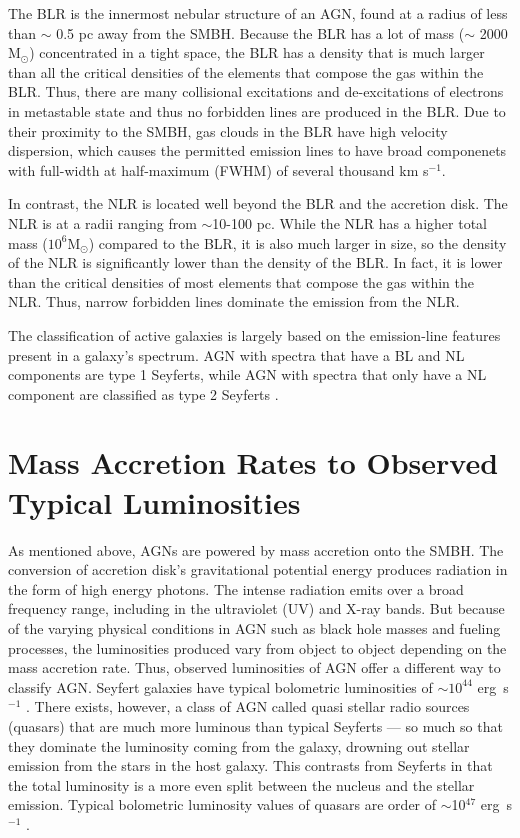The BLR is the innermost nebular structure of an AGN, found at a radius of less than $\sim$ 0.5 pc away from the SMBH.
Because the BLR has a lot of mass ($\sim$ 2000 M$_{\odot}$) concentrated in a tight space, the BLR has a density that is much larger than all the critical densities of the elements that compose the gas within the BLR.
Thus, there are many collisional excitations and de-excitations of electrons in metastable state and thus no forbidden lines are produced in the BLR.
Due to their proximity to the SMBH, gas clouds in the BLR have high velocity dispersion, which causes the permitted emission lines to have broad componenets with full-width at half-maximum (FWHM) of several thousand km s$^{-1}$.

In contrast, the NLR is located well beyond the BLR and the accretion disk.
The NLR is at a radii ranging from $\sim$10-100 pc.
While the NLR has a higher total mass ($10^6$M$_{\odot}$) compared to the BLR, it is also much larger in size, so the density of the NLR is significantly lower than the density of the BLR. 
In fact, it is lower than the critical densities of most elements that compose the gas within the NLR.
Thus, narrow forbidden lines dominate the emission from the NLR.

The classification of active galaxies is largely based on the emission-line features present in a galaxy's spectrum.
AGN with spectra that have a BL and NL components are type 1 Seyferts, while AGN with spectra that only have a NL component are classified as type 2 Seyferts \citep{khachikina1974}.




\section{Mass Accretion Rates to Observed Typical Luminosities}
\label{sub1_2}

As mentioned above, AGNs are powered by mass accretion onto the SMBH.
The conversion of accretion disk’s gravitational potential energy produces radiation in the form of high energy photons.
The intense radiation emits over a broad frequency range, including in the ultraviolet (UV) and X-ray bands.
But because of the varying physical conditions in AGN such as black hole masses and fueling processes, the luminosities produced vary from object to object depending on the mass accretion rate.
Thus, observed luminosities of AGN offer a different way to classify AGN.
Seyfert galaxies have typical bolometric luminosities of $\sim10^{44}$ erg~s$^{-1}$ \citep{Woo&Urry2002}.
There exists, however, a class of AGN called quasi stellar radio sources (quasars) that are much more luminous than typical Seyferts --- so much so that they dominate the luminosity coming from the galaxy, drowning out stellar emission from the stars in the host galaxy.
This contrasts from Seyferts in that the total luminosity is a more even split between the nucleus and the stellar emission. 
Typical bolometric luminosity values of quasars are order of $\sim$10$^{47}$ erg~s $^{-1}$ \citep{Woo&Urry2002}.

